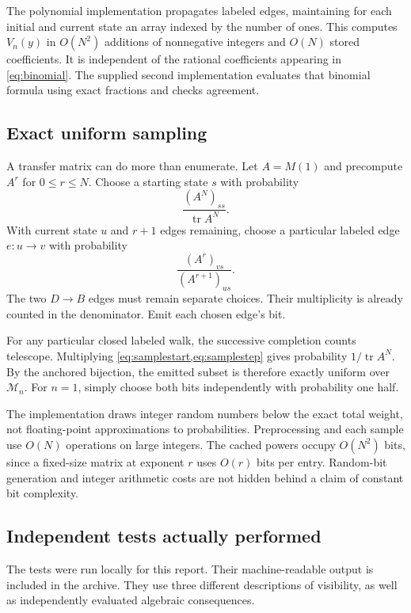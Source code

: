 \documentclass[11pt,a4paper]{article}
\theoremstyle{definition}
\newcommand{\tr}{\operatorname{tr}}
\newcommand{\MV}{\mathcal M}
\begin{document}
The polynomial implementation propagates labeled edges, maintaining for
each initial and current state an array indexed by the number of ones.
This computes $V_n(y)$ in $O(N^2)$ additions of nonnegative integers and
$O(N)$ stored coefficients. It is independent of the rational coefficients
appearing in \cref{eq:binomial}. The supplied second implementation evaluates
that binomial formula using exact fractions and checks agreement.

\subsection{Exact uniform sampling}

A transfer matrix can do more than enumerate. Let $A=M(1)$ and precompute
$A^r$ for $0\le r\le N$. Choose a starting state $s$ with probability
\begin{equation}
 \frac{(A^N)_{ss}}{\tr A^N}.
 \label{eq:samplestart}
\end{equation}
With current state $u$ and $r+1$ edges remaining, choose a particular labeled
edge $e:u\to v$ with probability
\begin{equation}
 \frac{(A^r)_{vs}}{(A^{r+1})_{us}}.
 \label{eq:samplestep}
\end{equation}
The two $D\to B$ edges must remain separate choices. Their multiplicity is
already counted in the denominator. Emit each chosen edge's bit.

For any particular closed labeled walk, the successive completion counts
telescope. Multiplying \cref{eq:samplestart,eq:samplestep} gives probability
$1/\tr A^N$. By the anchored bijection, the emitted subset is therefore
exactly uniform over $\MV_n$. For $n=1$, simply choose both bits independently
with probability one half.

The implementation draws integer random numbers below the exact total
weight, not floating-point approximations to probabilities. Preprocessing
and each sample use $O(N)$ operations on large integers. The cached powers
occupy $O(N^2)$ bits, since a fixed-size matrix at exponent $r$ uses $O(r)$
bits per entry. Random-bit generation and integer arithmetic costs are not
hidden behind a claim of constant bit complexity.

\subsection{Independent tests actually performed}

The tests were run locally for this report. Their machine-readable output
is included in the archive. They use three different descriptions of
visibility, as well as independently evaluated algebraic consequences.
\end{document}

